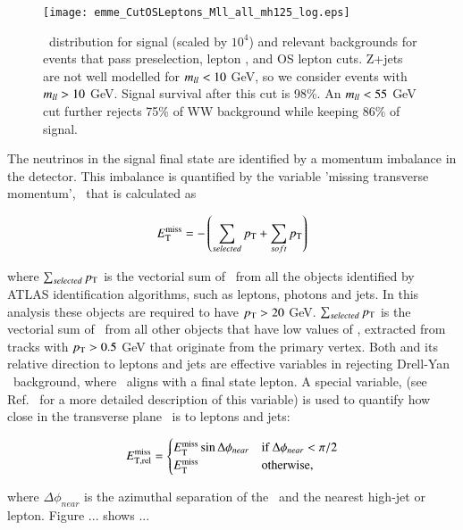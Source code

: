\begin{figure}[!h]
\centering
	\texttt{[image: emme\_CutOSLeptons\_Mll\_all\_mh125\_log.eps]}\\
\caption{\mll\ distribution for signal (scaled by $10^4$) and relevant backgrounds for 
events that pass preselection, lepton \pt, and OS lepton cuts. Z+jets are not well modelled 
for $m_{ll}<10$ GeV, so we consider events with $m_{ll}>10$ GeV. Signal survival after this cut 
is 98\%. An $m_{ll}<55$ GeV cut further rejects 75\% of WW background while keeping 86\% of signal.}
\label{fig:mllOSleptons}
\end{figure}

\par The neutrinos in the signal final state are identified by a momentum imbalance in the detector.
This imbalance is quantified by the variable 'missing transverse momentum',
\met\ that is calculated as 

\begin{equation}
E_{\mathrm{T}}^{\mathrm{miss}} = - \left (\sum_{selected}p_{\mathrm{T}} + \sum_{soft}p_{\mathrm{T}} \right )
\end{equation}   

where $\sum_{selected}p_{\mathrm{T}}$ is the vectorial sum of \pt\ from 
all the objects identified by ATLAS identification 
algorithms, such as leptons, photons and jets. In this analysis these 
objects are required to have $p_{\mathrm{T}}>20$ GeV. $\sum_{selected}p_{\mathrm{T}}$ is the vectorial sum 
of \pt\ from all other objects that have low values of \pt, extracted 
from tracks with $p_{\mathrm{T}}>0.5$ GeV that originate from the primary vertex. 
Both \met and its relative direction to leptons and jets are effective variables 
in rejecting Drell-Yan \tautau\ background, where \met\ 
aligns with a final state lepton. A special variable, \metRel (see Ref.~\cite{ATLASCONF2014060} for 
a more detailed description of this variable) is used to quantify how close in the transverse 
plane \met\ is to leptons and jets:

\begin{equation}
\metRel = \begin{cases}
				 \met\sin\Delta\phi_{near} & \text{if $\Delta\phi_{near}<\pi/2$} \\
				 \met & \text{otherwise,}
					\end{cases}
\end{equation}  

where $\Delta\phi_{near}$ is the azimuthal separation of the \met\ and the nearest 
high-\pt jet or lepton. Figure ... shows ...

